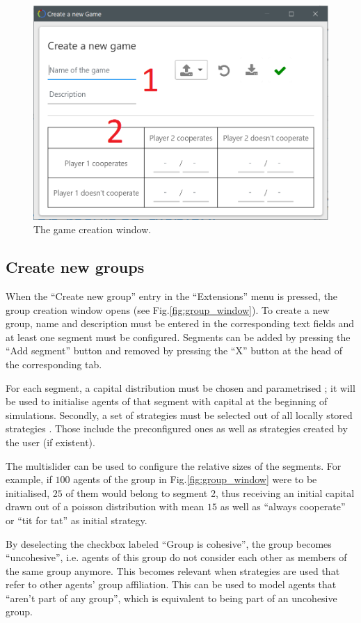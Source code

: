 \documentclass[parskip=full,11pt]{scrartcl}
\newcommand*\circled[1]{\tikz[baseline=(char.base)]{
            \node[shape=circle,draw,inner sep=2pt] (char) {#1};}}
\begin{document}
\begin{figure}
	\centering
	\includegraphics[width=0.8\linewidth]{img_manual/game_window.png}
	\caption{The game creation window.}
	\label{fig:game_window}
\end{figure}

\subsection{Create new groups}
When the \enquote{Create new group} entry in the \enquote{Extensions} menu is pressed, the group creation window opens (see Fig.\ref{fig:group_window}). To create a new group, name and description must be entered in the corresponding text fields \circled{1} and at least one segment must be configured. Segments can be added by pressing the \enquote{Add segment} button and removed by pressing the \enquote{X} button at the head of the corresponding tab.

For each segment, a capital distribution must be chosen and parametrised \circled{2}; it will be used to initialise agents of that segment with capital at the beginning of simulations. Secondly, a set of strategies must be selected out of all locally stored strategies \circled{3}. Those include the preconfigured ones as well as strategies created by the user (if existent).

The multislider \circled{4} can be used to configure the relative sizes of the segments. For example, if \(100\) agents of the group in Fig.\ref{fig:group_window} were to be initialised, \(25\) of them would belong to segment 2, thus receiving an initial capital drawn out of a poisson distribution with mean \(15\) as well as \enquote{always cooperate} or \enquote{tit for tat} as initial strategy.

By deselecting the checkbox labeled \enquote{Group is cohesive}, the group becomes \enquote{uncohesive}, i.e. agents of this group do not consider each other as members of the same group anymore. This becomes relevant when strategies are used that refer to other agents' group affiliation. This can be used to model agents that \enquote{aren't part of any group}, which is equivalent to being part of an uncohesive group.
\end{document}
